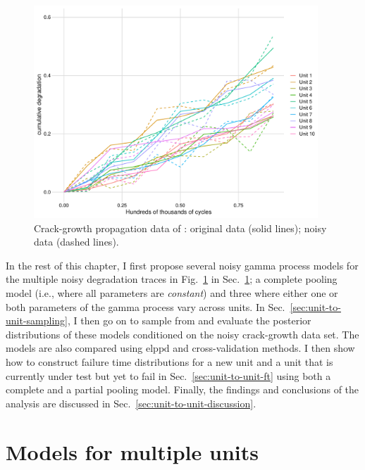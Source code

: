 \begin{figure}[tbp]
   \centering
   \includegraphics[width=0.95\textwidth]{./figures/ch-5/noisy-crack-growth-data.pdf}
   \caption{Crack-growth propagation data of \citet{rodriguez-picon2018}: original data (solid lines); noisy data (dashed lines).}
   \label{fig:crack-growth-w-noise}
\end{figure}

In the rest of this chapter, I first propose several noisy gamma process models for the multiple noisy degradation traces in Fig.~\ref{fig:crack-growth-w-noise} in Sec.~\ref{sec:unit-to-unit-models}; a complete pooling model (i.e., where all parameters are \emph{constant}) and three where either one or both parameters of the gamma process vary across units. In Sec.~\ref{sec:unit-to-unit-sampling}, I then go on to sample from and evaluate the posterior distributions of these models conditioned on the noisy crack-growth data set. The models are also compared using $\mbox{elppd}$ and cross-validation methods. I then show how to construct failure time distributions for a new unit and a unit that is currently under test but yet to fail in Sec.~\ref{sec:unit-to-unit-ft} using both a complete and a partial pooling model. Finally, the findings and conclusions of the analysis are discussed in Sec.~\ref{sec:unit-to-unit-discussion}.

\section{Models for multiple units} \label{sec:unit-to-unit-models}

